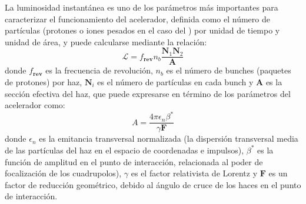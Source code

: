 La luminosidad instantánea es uno de los parámetros más importantes para caracterizar el funcio­namiento del acelerador, definida como el número de partículas (protones o iones pesados en el caso del \LHC) por unidad de tiempo y unidad de área, y puede calcularse mediante la relación:
\begin{equation}
\mathcal{L} = f_\mathbf{rev} n_b \dfrac{\mathbf{N}_1 \mathbf{N}_2}{\mathbf{A}}
\end{equation}
donde $f_\mathbf{rev}$ es la frecuencia de revolución, $n_b$ es el número de bunches (paquetes de protones) por haz, $\mathbf{N}_i$ es el número de partículas en cada bunch y $\mathbf{A}$ es la sección efectiva del haz, que puede expresarse en término de los parámetros del acelerador como:
\begin{equation}
A = \dfrac{4 \pi \epsilon_n \beta^*}{\gamma \mathbf{F}}
\end{equation}
donde $\epsilon_n$ es la emitancia transversal normalizada (la dispersión transversal media de las partículas del haz en el espacio de coordenadas e impulsos), $\beta^*$ es la función de amplitud en el punto de interacción, relacionada al poder de focalización de los cuadrupolos), $\gamma$ es el factor relativista de Lorentz y $\mathbf{F}$ es un factor de reducción geométrico, debido al ángulo de cruce de los haces en el punto de interacción.







